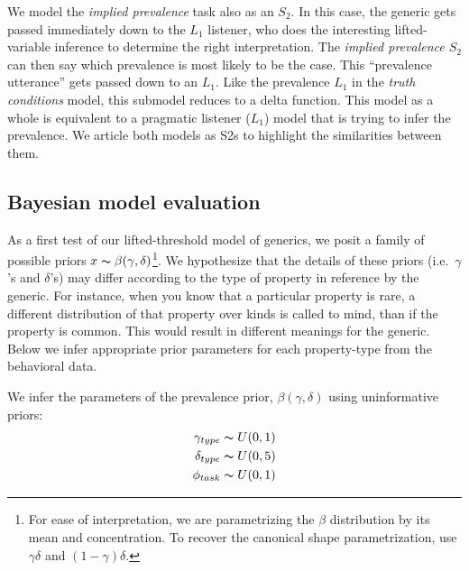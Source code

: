 \documentclass[10pt,letterpaper]{article}
\begin{document}
We model the \emph{implied prevalence} task also as an $S_{2}$. In this case, the generic gets passed immediately down to the $L_{1}$ listener, who does the interesting lifted-variable inference to determine the right interpretation. The \emph{implied prevalence $S_{2}$} can then say which prevalence is most likely to be the case. This ``prevalence utterance'' gets passed down to an $L_{1}$. Like the prevalence $L_{1}$ in the \emph{truth conditions} model, this submodel reduces to a delta function. This model as a whole is equivalent to a pragmatic listener ($L_{1}$) model that is trying to infer the prevalence. We article both models as S2s to highlight the similarities between them.

\subsection{Bayesian model evaluation}
\label{sec:model1}

As a first test of our lifted-threshold model of generics, we posit a family of possible priors $x \thicksim \beta(\gamma,\delta)$\footnote{For ease of interpretation, we are parametrizing the $\beta$ distribution by its mean and concentration. To recover the canonical shape parametrization, use $\gamma \delta$ and $(1-\gamma)\delta$.}. We hypothesize that the details of these priors (i.e.~$\gamma$'s and $\delta$'s) may differ according to the type of property in reference by the generic. For instance, when you know that a particular property is rare, a different distribution of that property over kinds is called to mind, than if the property is common. This would result in different meanings for the generic. Below we infer appropriate prior parameters for each property-type from the behavioral data.

We infer the parameters of the prevalence prior, $\beta(\gamma,\delta)$ using uninformative priors:
%
\begin{align*}
\gamma_{type} \thicksim U(0,1) \\
\delta_{type} \thicksim U(0,5) \\
\phi_{task} \thicksim U(0,1) 
\end{align*}
\end{document}
